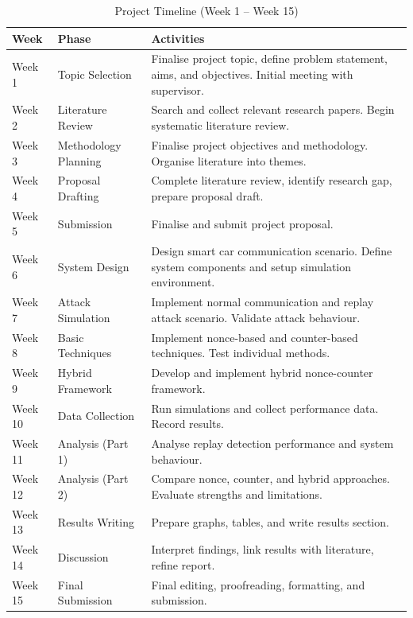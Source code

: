 \documentclass[a4paper,man,12pt]{article}
\begin{document}
\begin{table}[h]
\centering

\begin{tabular}{|l|l|p{9cm}|}
\hline
\textbf{Week} & \textbf{Phase} & \textbf{Activities} \\
\hline
Week 1  & Topic Selection      & Finalise project topic, define problem statement, aims, and objectives. Initial meeting with supervisor. \\
\hline
Week 2  & Literature Review    & Search and collect relevant research papers. Begin systematic literature review. \\
\hline
Week 3  & Methodology Planning & Finalise project objectives and methodology. Organise literature into themes. \\
\hline
Week 4  & Proposal Drafting    & Complete literature review, identify research gap, prepare proposal draft. \\
\hline
Week 5  & Submission           & Finalise and submit project proposal. \\
\hline
Week 6  & System Design        & Design smart car communication scenario. Define system components and setup simulation environment. \\
\hline
Week 7  & Attack Simulation    & Implement normal communication and replay attack scenario. Validate attack behaviour. \\
\hline
Week 8  & Basic Techniques     & Implement nonce-based and counter-based techniques. Test individual methods. \\
\hline
Week 9  & Hybrid Framework     & Develop and implement hybrid nonce-counter framework. \\
\hline
Week 10 & Data Collection      & Run simulations and collect performance data. Record results. \\
\hline
Week 11 & Analysis (Part 1)    & Analyse replay detection performance and system behaviour. \\
\hline
Week 12 & Analysis (Part 2)    & Compare nonce, counter, and hybrid approaches. Evaluate strengths and limitations. \\
\hline
Week 13 & Results Writing      & Prepare graphs, tables, and write results section. \\
\hline
Week 14 & Discussion           & Interpret findings, link results with literature, refine report. \\
\hline
Week 15 & Final Submission     & Final editing, proofreading, formatting, and submission. \\
\hline
\end{tabular}
\caption{Project Timeline (Week 1 -- Week 15)}
\label{tab:project_timeline}
\end{table}
\end{document}
